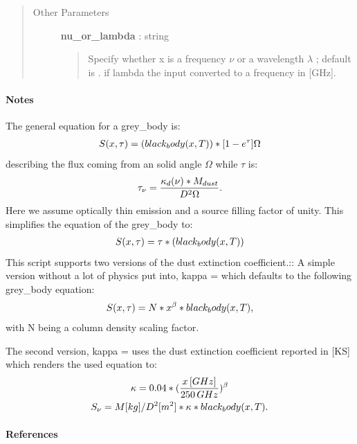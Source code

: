 \documentclass[a4paper,10pt,english]{sphinxmanual}
\begin{document}
\begin{fulllineitems}
\begin{quote}
\begin{description}
\item[{Other Parameters}] \leavevmode
\textbf{nu\_or\_lambda} : string
\begin{quote}

Specify whether x is a frequency $\nu$  or a wavelength
$\lambda$ ; default is . if lambda the input
converted to a frequency in {[}GHz{]}.
\end{quote}

\end{description}\end{quote}
\paragraph{Notes}

The general equation for a grey\_body is:
\begin{gather}
\begin{split}S(x, \tau) = (black_body(x, T)) * [1 - e^\tau] \Omega\end{split}\notag
\end{gather}
describing the flux coming from an solid angle
$\Omega$ while $\tau$ is:
\begin{gather}
\begin{split}\tau_{\nu} = \frac{ \kappa_d(\nu) * M_{dust}}{D^2 \Omega} .\end{split}\notag
\end{gather}
Here we assume optically thin emission and a source filling factor of
unity. This simplifies the equation of the grey\_body to:
\begin{gather}
\begin{split}S(x, \tau) = \tau * (black_body(x, T))\end{split}\notag
\end{gather}
This script supports two versions of the dust extinction coefficient.::
A simple version without a lot of physics put into, kappa = 
which defaults to the following grey\_body equation:
\begin{gather}
\begin{split}S(x, \tau) = N * x^{\beta} * black_body(x,T) ,\end{split}\notag
\end{gather}
with N being a column density scaling factor.

The second version, kappa =  uses the dust extinction
coefficient reported in {[}KS{]} which renders the used equation to:
\begin{gather}
\begin{split}\kappa = 0.04 * (\frac{x\,[GHz]}{250\,GHz})^{\beta}\end{split}\notag\\\begin{split}S_{\nu} = M[kg] / D^2[m^2] * \kappa * black_body(x,T) .\end{split}\notag
\end{gather}\paragraph{References}


\end{fulllineitems}
\end{document}
